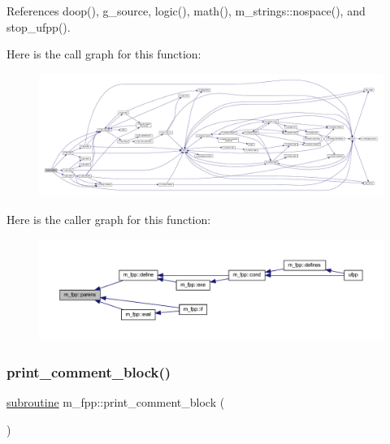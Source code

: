 References doop(), g\+\_\+source, logic(), math(), m\+\_\+strings\+::nospace(), and stop\+\_\+ufpp().

Here is the call graph for this function\+:
\nopagebreak
\begin{figure}[H]
\begin{center}
\leavevmode
\includegraphics[width=350pt]{namespacem__fpp_a4b9be76f637b58b358ee2a9ec95db933_cgraph}
\end{center}
\end{figure}
Here is the caller graph for this function\+:
\nopagebreak
\begin{figure}[H]
\begin{center}
\leavevmode
\includegraphics[width=350pt]{namespacem__fpp_a4b9be76f637b58b358ee2a9ec95db933_icgraph}
\end{center}
\end{figure}
\mbox{\label{namespacem__fpp_a27e4c26021feb655e915c1835e40e8f4}} 
\subsubsection{\texorpdfstring{print\+\_\+comment\+\_\+block()}{print\_comment\_block()}}
{\footnotesize\ttfamily \hyperlink{M__stopwatch_83_8txt_acfbcff50169d691ff02d4a123ed70482}{subroutine} m\+\_\+fpp\+::print\+\_\+comment\+\_\+block (\begin{DoxyParamCaption}{ }\end{DoxyParamCaption})}



